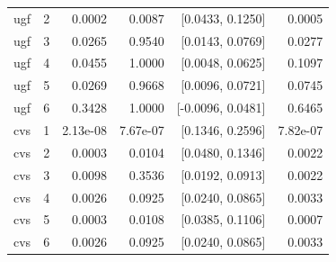 \begin{tabular}{llrrrr}
ugf & 2 & 0.0002 & 0.0087 & [0.0433, 0.1250] & 0.0005 \\
ugf & 3 & 0.0265 & 0.9540 & [0.0143, 0.0769] & 0.0277 \\
ugf & 4 & 0.0455 & 1.0000 & [0.0048, 0.0625] & 0.1097 \\
ugf & 5 & 0.0269 & 0.9668 & [0.0096, 0.0721] & 0.0745 \\
ugf & 6 & 0.3428 & 1.0000 & [-0.0096, 0.0481] & 0.6465 \\
cvs & 1 & 2.13e-08 & 7.67e-07 & [0.1346, 0.2596] & 7.82e-07 \\
cvs & 2 & 0.0003 & 0.0104 & [0.0480, 0.1346] & 0.0022 \\
cvs & 3 & 0.0098 & 0.3536 & [0.0192, 0.0913] & 0.0022 \\
cvs & 4 & 0.0026 & 0.0925 & [0.0240, 0.0865] & 0.0033 \\
cvs & 5 & 0.0003 & 0.0108 & [0.0385, 0.1106] & 0.0007 \\
cvs & 6 & 0.0026 & 0.0925 & [0.0240, 0.0865] & 0.0033 \\
\hline
\end{tabular}
